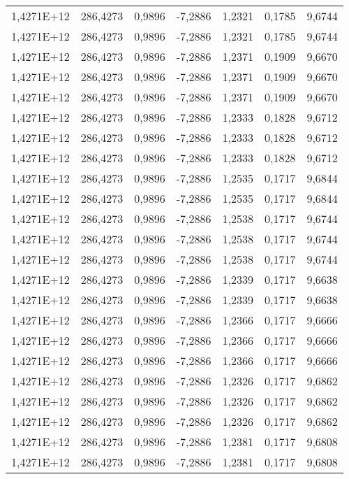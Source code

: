 \begin{table}[htbp]
\begin{tabular}{rrrrrrr}
    1,4271E+12 & 286,4273 & 0,9896 & -7,2886 & 1,2321 & 0,1785 & 9,6744 \\
    1,4271E+12 & 286,4273 & 0,9896 & -7,2886 & 1,2321 & 0,1785 & 9,6744 \\
    1,4271E+12 & 286,4273 & 0,9896 & -7,2886 & 1,2371 & 0,1909 & 9,6670 \\
    1,4271E+12 & 286,4273 & 0,9896 & -7,2886 & 1,2371 & 0,1909 & 9,6670 \\
    1,4271E+12 & 286,4273 & 0,9896 & -7,2886 & 1,2371 & 0,1909 & 9,6670 \\
    1,4271E+12 & 286,4273 & 0,9896 & -7,2886 & 1,2333 & 0,1828 & 9,6712 \\
    1,4271E+12 & 286,4273 & 0,9896 & -7,2886 & 1,2333 & 0,1828 & 9,6712 \\
    1,4271E+12 & 286,4273 & 0,9896 & -7,2886 & 1,2333 & 0,1828 & 9,6712 \\
    1,4271E+12 & 286,4273 & 0,9896 & -7,2886 & 1,2535 & 0,1717 & 9,6844 \\
    1,4271E+12 & 286,4273 & 0,9896 & -7,2886 & 1,2535 & 0,1717 & 9,6844 \\
    1,4271E+12 & 286,4273 & 0,9896 & -7,2886 & 1,2538 & 0,1717 & 9,6744 \\
    1,4271E+12 & 286,4273 & 0,9896 & -7,2886 & 1,2538 & 0,1717 & 9,6744 \\
    1,4271E+12 & 286,4273 & 0,9896 & -7,2886 & 1,2538 & 0,1717 & 9,6744 \\
    1,4271E+12 & 286,4273 & 0,9896 & -7,2886 & 1,2339 & 0,1717 & 9,6638 \\
    1,4271E+12 & 286,4273 & 0,9896 & -7,2886 & 1,2339 & 0,1717 & 9,6638 \\
    1,4271E+12 & 286,4273 & 0,9896 & -7,2886 & 1,2366 & 0,1717 & 9,6666 \\
    1,4271E+12 & 286,4273 & 0,9896 & -7,2886 & 1,2366 & 0,1717 & 9,6666 \\
    1,4271E+12 & 286,4273 & 0,9896 & -7,2886 & 1,2366 & 0,1717 & 9,6666 \\
    1,4271E+12 & 286,4273 & 0,9896 & -7,2886 & 1,2326 & 0,1717 & 9,6862 \\
    1,4271E+12 & 286,4273 & 0,9896 & -7,2886 & 1,2326 & 0,1717 & 9,6862 \\
    1,4271E+12 & 286,4273 & 0,9896 & -7,2886 & 1,2326 & 0,1717 & 9,6862 \\
    1,4271E+12 & 286,4273 & 0,9896 & -7,2886 & 1,2381 & 0,1717 & 9,6808 \\
    1,4271E+12 & 286,4273 & 0,9896 & -7,2886 & 1,2381 & 0,1717 & 9,6808 \\

\end{tabular}
\end{table}
